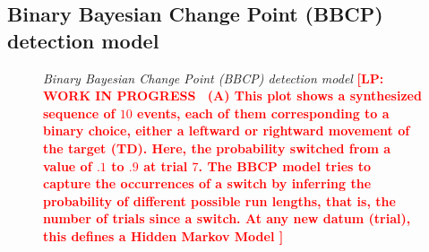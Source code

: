 \documentclass[12pt,english]{article}%
\newcommand{\seeFig}[1]{Figure~\ref{fig:#1}}
\newcommand{\LP}[1]{\textbf{\textcolor{red}{[LP: #1]}}}
\begin{document}
\subsection{Binary Bayesian Change Point (BBCP) detection model}
\begin{figure}%
\caption{\emph{Binary Bayesian Change Point (BBCP) detection model}
\LP{WORK IN PROGRESS ~\textbf{(A)} This plot shows a synthesized sequence of $10$ events,
each of them corresponding to a binary choice,
either a leftward or rightward movement of the target (TD).
Here, the probability switched from a value of $.1$ to $.9$ at trial $7$.
The BBCP model tries to capture the occurrences of a switch
by inferring the probability of different possible run lengths,
that is, the number of trials since a switch.
At any new datum (trial), this defines a Hidden Markov Model
}}
\end{figure}
\end{document}
